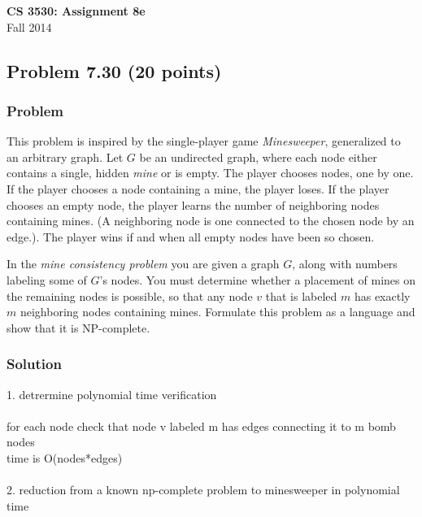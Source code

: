 \documentclass{article}
\begin{document}
\begin{empfile}

\begin{center}
\textbf{\Large CS 3530: Assignment 8e} \\[2mm]
Fall 2014
\end{center}

\raggedright

\subsection*{Problem 7.30 (20 points)}

\subsubsection*{Problem}

This problem is inspired by the single-player game
\textit{Minesweeper}, generalized to an arbitrary graph. Let $G$ be
an undirected graph, where each node either contains a single,
hidden \textit{mine} or is empty. The player chooses nodes, one by
one. If the player chooses a node containing a mine, the player
loses. If the player chooses an empty node, the player learns the
number of neighboring nodes containing mines. (A neighboring node is
one connected to the chosen node by an edge.). The player wins if
and when all empty nodes have been so chosen.

In the \textit{mine consistency problem} you are given a graph $G$,
along with numbers labeling some of $G$'s nodes. You must determine
whether a placement of mines on the remaining nodes is possible, so
that any node $v$ that is labeled $m$ has exactly $m$ neighboring
nodes containing mines. Formulate this problem as a language and
show that it is NP-complete.

\subsubsection*{Solution}

1. detrermine polynomial time verification \\ \ \\

for each node check that node v labeled m has edges connecting it to m bomb nodes \\
time is O(nodes*edges) \\ \ \\


2. reduction from a known np-complete problem to minesweeper in polynomial time\\ \ \\


\end{empfile}
\end{document}
